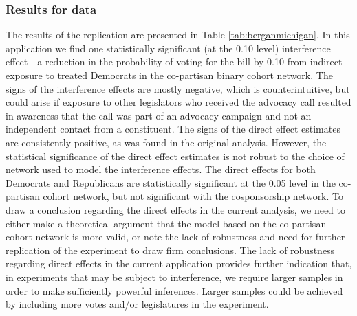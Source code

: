 \documentclass[12pt]{article}
\begin{document}
\subsubsection{Results for \citet{bergan2015call} data}

The results of the \citet{bergan2015call} replication are presented in Table \ref{tab:berganmichigan}. In this application we find one statistically significant (at the 0.10 level) interference effect---a reduction in the probability of voting for the bill by 0.10 from indirect exposure to treated Democrats in the co-partisan binary cohort network. The signs of the interference effects are mostly negative, which is counterintuitive, but could arise if exposure to other legislators who received the advocacy call resulted in awareness that the call was part of an advocacy campaign and not an independent contact from a constituent. The signs of the direct effect estimates are consistently positive, as was found in the original analysis. However, the statistical significance of the direct effect estimates is not robust to the choice of network used to model the interference effects. The direct effects for both Democrats and Republicans are statistically significant at the 0.05 level in the co-partisan cohort network, but not significant with the cosponsorship network.  To draw a conclusion regarding the direct effects in the current analysis, we need to either make a theoretical argument that the model based on the co-partisan cohort network is more valid, or note the lack of robustness and need for further replication of the experiment to draw firm conclusions. The lack of robustness regarding direct effects in the current application provides further indication that, in experiments that may be subject to interference, we require larger samples in order to make sufficiently powerful inferences. Larger samples could be achieved by including more votes and/or legislatures in the experiment.
\end{document}
